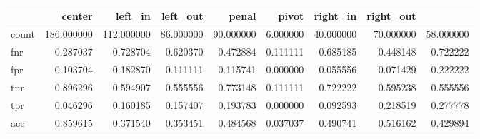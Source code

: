 \begin{tabular}{lrrrrrrrr}
\toprule
{} &      center &    left\_in &   left\_out &     penal &      pivot &   right\_in &  right\_out \\
\midrule
count &  186.000000 &  112.000000 &  86.000000 &  90.000000 &  6.000000 &  40.000000 &  70.000000 &  58.000000 \\
fnr   &    0.287037 &    0.728704 &   0.620370 &   0.472884 &  0.111111 &   0.685185 &   0.448148 &   0.722222 \\
fpr   &    0.103704 &    0.182870 &   0.111111 &   0.115741 &  0.000000 &   0.055556 &   0.071429 &   0.222222 \\
tnr   &    0.896296 &    0.594907 &   0.555556 &   0.773148 &  0.111111 &   0.722222 &   0.595238 &   0.555556 \\
tpr   &    0.046296 &    0.160185 &   0.157407 &   0.193783 &  0.000000 &   0.092593 &   0.218519 &   0.277778 \\
acc   &    0.859615 &    0.371540 &   0.353451 &   0.484568 &  0.037037 &   0.490741 &   0.516162 &   0.429894 \\
\bottomrule
\end{tabular}
